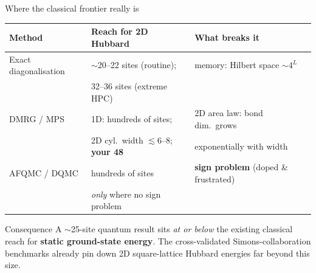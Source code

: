 \documentclass[aspectratio=169,11pt]{beamer}
\begin{document}
\begin{frame}{Where the classical frontier really is}
\begin{center}\small
\renewcommand{\arraystretch}{1.25}
\begin{tabular}{@{}lll@{}}
\toprule
\textbf{Method} & \textbf{Reach for 2D Hubbard} & \textbf{What breaks it} \\
\midrule
Exact diagonalisation & $\sim$20--22 sites (routine); & memory: Hilbert space $\sim 4^{L}$\\
 & 32--36 sites (extreme HPC) & \\
DMRG / MPS & 1D: hundreds of sites; & 2D area law: bond dim.\ grows \\
 & 2D cyl.\ width $\lesssim 6$--$8$; \textbf{your 48} & exponentially with width \\
AFQMC / DQMC & hundreds of sites & \textbf{sign problem} (doped \& frustrated) \\
 & \emph{only} where no sign problem & \\
\bottomrule
\end{tabular}
\end{center}

\vspace{4pt}
\begin{alertblock}{Consequence}
A $\sim$25-site quantum result sits \emph{at or below} the existing classical reach
for \textbf{static ground-state energy}. The cross-validated Simons-collaboration
benchmarks already pin down 2D square-lattice Hubbard energies far beyond this size.
\end{alertblock}
\end{frame}
\end{document}

